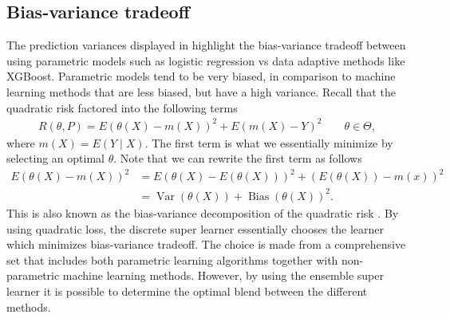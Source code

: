 \documentclass[11pt, a4paper]{article}
\theoremstyle{definition}
\theoremstyle{remark}
\newcommand{\btheta}{\theta}
\begin{document}
\subsection{Bias-variance tradeoff} 
The prediction variances displayed in  highlight the bias-variance tradeoff between using parametric models such as logistic regression vs data adaptive methods like XGBoost. Parametric models tend to be very biased, in comparison to machine learning methods that are less biased, but have a high variance. Recall that the quadratic risk factored into the following terms 
\begin{align*}
    R(\btheta, P) = E ( \btheta(X) - m(X) )^2 + E ( m(X) - Y )^2 \qquad \btheta \in \Theta,
\end{align*}
where $ m(X) = E(Y \mid X) $. The first term is what we essentially minimize by selecting an optimal $ \btheta $. Note that we can rewrite the first term as follows 
\begin{align*}
    E ( \btheta(X) - m(X) )^2 &= E (\btheta(X) - E(\btheta(X)) )^2 + (E(\btheta(X)) - m(x) )^2\\
                              &= \operatorname{Var}(\btheta(X)) + \operatorname{Bias}(\btheta(X))^2.
\end{align*}
This is also known as the bias-variance decomposition of the quadratic risk \parencite{gyorfi2002distribution}. By using quadratic loss, the discrete super learner essentially chooses the learner which minimizes bias-variance tradeoff. The choice is made from a comprehensive set that includes both parametric learning algorithms together with non-parametric machine learning methods. However, by using the ensemble super learner it is possible to determine the optimal blend between the different methods. 
\end{document}
